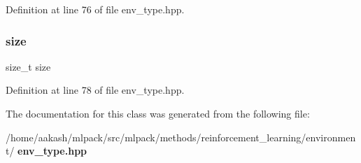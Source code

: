 Definition at line 76 of file env\+\_\+type.\+hpp.

\mbox{\label{classmlpack_1_1rl_1_1DiscreteActionEnv_1_1Action_a854352f53b148adc24983a58a1866d66}} 
\subsubsection{size}
{\footnotesize\ttfamily size\+\_\+t size\hspace{0.3cm}{\ttfamily [static]}}



Definition at line 78 of file env\+\_\+type.\+hpp.



The documentation for this class was generated from the following file\+:\begin{DoxyCompactItemize}
\item 
/home/aakash/mlpack/src/mlpack/methods/reinforcement\+\_\+learning/environment/\textbf{ env\+\_\+type.\+hpp}\end{DoxyCompactItemize}
